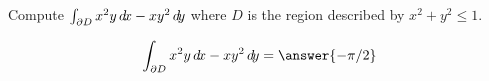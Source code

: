 \documentclass{ximera}
\author{David Guichard \and Neal Koblitz \and H. Jerome Keisler \and Albert Scheller \and Barry Balof \and Mike Wills \and Matthew Carr}
\begin{document}
\begin{exercise}




Compute $\int_{\partial D}x^2 y\mathop{}\!d\! x-xy^2\mathop{}\!d\! y$ where $D$ is the region described by $x^2+y^2\le 1$. 

\begin{prompt}
\[
\int_{\partial D}x^2 y\d x-xy^2\d y=\answer{-\pi/2}
\]
\end{prompt}

\end{exercise}
\end{document}

